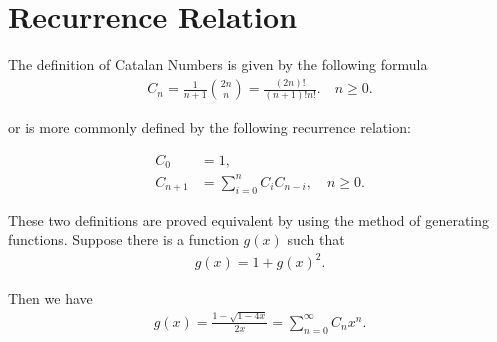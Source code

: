 \section{Recurrence Relation}
The definition of Catalan Numbers is given by the following formula
\[
\begin{aligned}
    C_n = \frac{1}{n+1}\binom{2n}{n} = \frac{(2n)!}{(n+1)!n!}.\quad n \geq 0.
\end{aligned}
\]

or is more commonly defined by the following recurrence relation:

\[
\begin{aligned}
    C_0 &= 1, \\
    C_{n+1} &= \sum_{i=0}^{n} C_i C_{n-i}, \quad n \geq 0.
\end{aligned}
\]

These two definitions are proved equivalent by using the method of generating functions.
Suppose there is a function $g(x)$ such that
\[
\begin{aligned}
    g(x) = 1 + g(x)^2.
\end{aligned}
\]

Then we have
\[
\begin{aligned}
    g(x) = \frac{1 - \sqrt{1 - 4x}}{2x} = \sum_{n=0}^{\infty} C_n x^n.
\end{aligned}
\]

